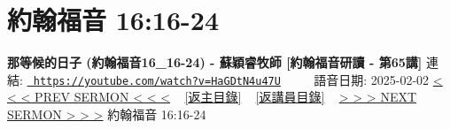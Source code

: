 \documentclass{book}
\begin{document}
\section{約翰福音 16:16-24}
\label{sec:HaGDtN4u47U}
\textbf{那等候的日子 (約翰福音16\_16-24) - 蘇穎睿牧師 [約翰福音研讀 - 第65講]}
\newline
\newline
連結: \href{https://youtube.com/watch?v=HaGDtN4u47U}{\texttt{ https://youtube.com/watch?v=HaGDtN4u47U}} ~~~~ 語音日期: 2025-02-02 
\newline
\newline
\hyperref[sec:M4alGuubf1o]{< < < PREV SERMON < < <}
~
\hyperlink{toc}{[返主目錄]}
~
\hyperref[ch:preacher5]{[返講員目錄]}
~
\hyperref[sec:fV_h6TniAkc]{> > > NEXT SERMON > > >}
\newline
\newline
約翰福音 16:16-24
\newline
\end{document}
